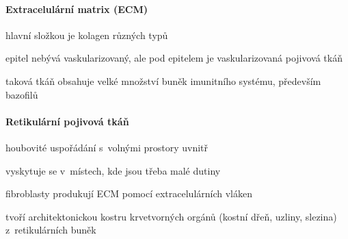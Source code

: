 \documentclass[DIV=8]{scrreprt}
\begin{document}
\paragraph{Extracelulární matrix (ECM)}
\begin{myItemize}[nosep]
    \item hlavní složkou je kolagen různých typů
    \item epitel nebývá vaskularizovaný, ale pod epitelem je vaskularizovaná pojivová tkáň
\begin{myItemize}[nosep]
    \item taková tkáň obsahuje velké množství buněk imunitního systému, především bazofilů
\end{myItemize}

\end{myItemize}



\paragraph{Retikulární pojivová tkáň}
\begin{myItemize}[nosep]
    \item houbovité uspořádání s volnými prostory uvnitř
    \item vyskytuje se v místech, kde jsou třeba malé dutiny
    \item fibroblasty produkují ECM pomocí extracelulárních vláken
\begin{myItemize}[nosep]
    \item tvoří architektonickou kostru krvetvorných orgánů (kostní dřeň, uzliny, slezina) z retikulárních buněk
\end{myItemize}

\end{myItemize}



\end{document}
